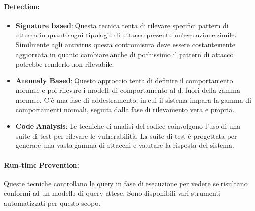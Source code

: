 \paragraph{Detection:}
\begin{itemize}
    \item \textbf{Signature based}: Questa tecnica tenta di rilevare specifici
          pattern di attacco in quanto ogni tipologia di attacco presenta
          un'esecuzione simile. Similmente agli antivirus questa contromisura
          deve essere costantemente aggiornata in quanto cambiare anche di pochissimo
          il pattern di attacco potrebbe renderlo non rilevabile.
    \item \textbf{Anomaly Based}: Questo approccio tenta di definire il
          comportamento normale e poi rilevare i modelli di comportamento al
          di fuori della gamma normale. C'è una fase di
          addestramento, in cui il sistema impara la gamma di comportamenti
          normali, seguita dalla fase di rilevamento vera e propria.
    \item \textbf{Code Analysis}: Le tecniche di analisi del
          codice coinvolgono l'uso di una suite di test per rilevare le
          vulnerabilità. La suite di test è progettata per generare una
          vasta gamma di attacchi e valutare la risposta del sistema.
\end{itemize}

\paragraph{Run-time Prevention:}
Queste tecniche controllano le query in fase di esecuzione per vedere se risultano
conformi ad un modello di query attese. Sono disponibili vari strumenti
automatizzati per questo scopo.